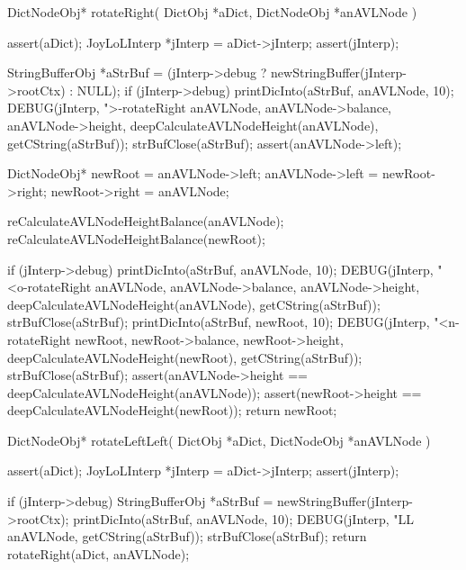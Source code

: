 DictNodeObj* rotateRight(
  DictObj     *aDict,
  DictNodeObj *anAVLNode
) {
  assert(aDict);
  JoyLoLInterp *jInterp = aDict->jInterp;
  assert(jInterp);
 
  StringBufferObj *aStrBuf =
    (jInterp->debug ? newStringBuffer(jInterp->rootCtx) : NULL);
  if (jInterp->debug) {
    printDicInto(aStrBuf, anAVLNode, 10);
    DEBUG(jInterp, ">-rotateRight %
          anAVLNode, anAVLNode->balance, anAVLNode->height,
          deepCalculateAVLNodeHeight(anAVLNode),
          getCString(aStrBuf));
    strBufClose(aStrBuf);
  }
  assert(anAVLNode->left);

  DictNodeObj* newRoot = anAVLNode->left;
  anAVLNode->left = newRoot->right;
  newRoot->right  = anAVLNode;

  reCalculateAVLNodeHeightBalance(anAVLNode);
  reCalculateAVLNodeHeightBalance(newRoot);

  if (jInterp->debug) {
    printDicInto(aStrBuf, anAVLNode, 10);
    DEBUG(jInterp, "<o-rotateRight %
          anAVLNode, anAVLNode->balance, anAVLNode->height,
          deepCalculateAVLNodeHeight(anAVLNode),
          getCString(aStrBuf));
    strBufClose(aStrBuf);
    printDicInto(aStrBuf, newRoot, 10);
    DEBUG(jInterp, "<n-rotateRight %
          newRoot, newRoot->balance, newRoot->height,
          deepCalculateAVLNodeHeight(newRoot),
          getCString(aStrBuf));
    strBufClose(aStrBuf);
  }
  assert(anAVLNode->height == deepCalculateAVLNodeHeight(anAVLNode));
  assert(newRoot->height == deepCalculateAVLNodeHeight(newRoot));
  return newRoot;
}
DictNodeObj* rotateLeftLeft(
  DictObj     *aDict,
  DictNodeObj *anAVLNode
) {
  assert(aDict);
  JoyLoLInterp *jInterp = aDict->jInterp;
  assert(jInterp);
 
  if (jInterp->debug) {
    StringBufferObj *aStrBuf = newStringBuffer(jInterp->rootCtx);
    printDicInto(aStrBuf, anAVLNode, 10);
    DEBUG(jInterp, "LL %
      anAVLNode, getCString(aStrBuf));
    strBufClose(aStrBuf);
  }
  return rotateRight(aDict, anAVLNode);
}

